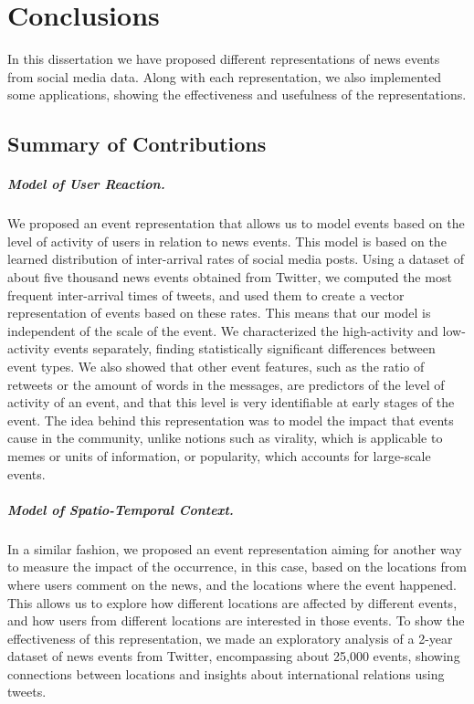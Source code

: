 \chapter{Conclusions}

In this dissertation we have proposed different representations of news events
from social media data.
%
Along with each representation, we also implemented some applications, showing
the effectiveness and usefulness of the representations.

\section{Summary of Contributions}

\paragraph{Model of User Reaction.}
%
We proposed an event representation that allows us to model events based on the
level of activity of users in relation to news events. 
%
This model is based on the learned distribution of inter-arrival rates of social
media posts.
%
Using a dataset of about five thousand news events obtained from Twitter, we
computed the most frequent inter-arrival times of tweets, and used them to create
a vector representation of events based on these rates.
%
This means that our model is independent of the scale of the event.
%
We characterized the high-activity and low-activity events separately, finding
statistically significant differences between event types.
%
We also showed that other event features, such as the ratio of retweets or the
amount of words in the messages, are predictors of the level of activity of an
event, and that this level is very identifiable at early stages of the event.
%
The idea behind this representation was to model the impact that events cause in
the community, unlike notions such as virality, which is applicable to memes or
units of information, or popularity, which accounts for large-scale events.

\paragraph{Model of Spatio-Temporal Context.}
%
In a similar fashion, we proposed an event representation aiming for another way
to measure the impact of the occurrence, in this case, based on the locations
from where users comment on the news, and the locations where the event
happened.
%
This allows us to explore how different locations are affected by different
events, and how users from different locations are interested in those events.
%
To show the effectiveness of this representation, we made an exploratory
analysis of a 2-year dataset of news events from Twitter, encompassing about
25,000 events, showing connections between locations and insights about
international relations using tweets.

